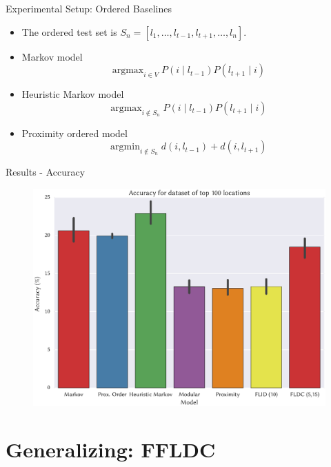 \documentclass{beamer}
\DeclareMathOperator*{\argmin}{argmin}
\DeclareMathOperator*{\argmax}{argmax}
\begin{document}
\begin{frame}{Experimental Setup: Ordered Baselines}
  \begin{itemize}
    \item The ordered test set is $S_{n} = [l_{1}, \dots, l_{t-1}, l_{t+1}, \dots, l_{n}]$.
    \item Markov model
      \begin{equation*}
        \argmax_{i \in V} P(i \mid l_{t-1})P(l_{t+1} \mid i)
      \end{equation*}
    \item Heuristic Markov model
      \begin{equation*}
        \argmax_{i \notin S_{n}} P(i \mid l_{t-1})P(l_{t+1} \mid i)
      \end{equation*}
    \item Proximity ordered model
      \begin{equation}
        \argmin_{i \notin S_{n}} d(i, l_{t-1}) + d(i, l_{t+1})
      \end{equation}
  \end{itemize}
\end{frame}

\begin{frame}{Results - Accuracy}
  \begin{figure}
    \centering
    \includegraphics[width=.85\textwidth]{all_models_100_presentation}
  \end{figure}
\end{frame}

\section{Generalizing: FFLDC}
\end{document}
